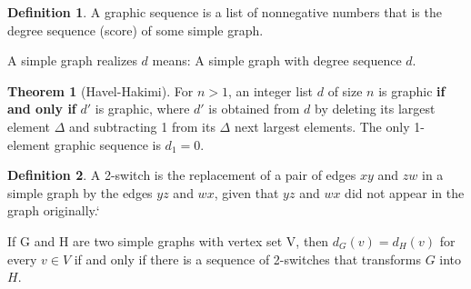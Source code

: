 \documentclass{article}
\theoremstyle{definition}
\newtheorem*{defi}{Definition}
\theoremstyle{definition}
\newenvironment{manualcoro}[1]{%
  \renewcommand\themanualcoroinner{#1}%
  \manualcoroinner
}{\endmanualcoroinner}
\theoremstyle{named}
\newtheorem*{namedtheorem}{Theorem}
\begin{document}
\begin{defi}
    A graphic sequence is a list of nonnegative
numbers that is the degree sequence (score)
of some simple graph.
\end{defi}

A simple graph realizes $d$ means: A simple graph with degree
sequence $d$.


\begin{namedtheorem}[Havel-Hakimi] For $n > 1$, an integer
list $d$ of size $n$ is graphic \textbf{if and only if} $d'$ is graphic, where $d'$
is obtained from $d$ by deleting its largest element $\Delta$ and
subtracting 1 from its $\Delta$ next largest elements. The only 1-
element graphic sequence is $d_1 = 0$.
\end{namedtheorem}

\begin{defi}
    A 2-switch is the replacement of a pair of
edges $xy$ and $zw$ in a simple graph by the
edges $yz$ and $wx$, given that $yz$ and $wx$ did
not appear in the graph originally.`
\end{defi}




\begin{manualcoro}{7.1}
    If G and H are two simple graphs with
vertex set V, then $d_G (v)=d_H (v)$ for every $v \in V$ if and only
if there is a sequence of 2-switches that transforms $G$
into $H$.
\end{manualcoro}


\begin{center}
\usetikzlibrary {arrows.meta}

\end{center}
\end{document}
